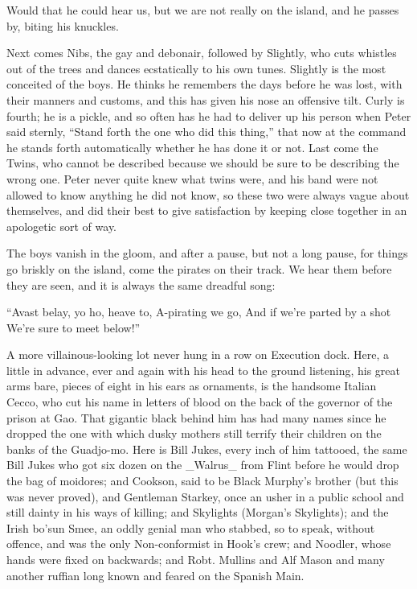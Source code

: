 Would that he could hear us, but we are not really on the island, and
he passes by, biting his knuckles.

Next comes Nibs, the gay and debonair, followed by Slightly, who cuts
whistles out of the trees and dances ecstatically to his own tunes.
Slightly is the most conceited of the boys. He thinks he remembers the
days before he was lost, with their manners and customs, and this has
given his nose an offensive tilt. Curly is fourth; he is a pickle, and
so often has he had to deliver up his person when Peter said sternly,
``Stand forth the one who did this thing,'' that now at the command he
stands forth automatically whether he has done it or not. Last come the
Twins, who cannot be described because we should be sure to be
describing the wrong one. Peter never quite knew what twins were, and
his band were not allowed to know anything he did not know, so these
two were always vague about themselves, and did their best to give
satisfaction by keeping close together in an apologetic sort of way.

The boys vanish in the gloom, and after a pause, but not a long pause,
for things go briskly on the island, come the pirates on their track.
We hear them before they are seen, and it is always the same dreadful
song:

``Avast belay, yo ho, heave to,
    A-pirating we go,
And if we're parted by a shot
    We're sure to meet below!''

A more villainous-looking lot never hung in a row on Execution dock.
Here, a little in advance, ever and again with his head to the ground
listening, his great arms bare, pieces of eight in his ears as
ornaments, is the handsome Italian Cecco, who cut his name in letters
of blood on the back of the governor of the prison at Gao. That
gigantic black behind him has had many names since he dropped the one
with which dusky mothers still terrify their children on the banks of
the Guadjo-mo. Here is Bill Jukes, every inch of him tattooed, the same
Bill Jukes who got six dozen on the _Walrus_ from Flint before he would
drop the bag of moidores; and Cookson, said to be Black Murphy's
brother (but this was never proved), and Gentleman Starkey, once an
usher in a public school and still dainty in his ways of killing; and
Skylights (Morgan's Skylights); and the Irish bo'sun Smee, an oddly
genial man who stabbed, so to speak, without offence, and was the only
Non-conformist in Hook's crew; and Noodler, whose hands were fixed on
backwards; and Robt. Mullins and Alf Mason and many another ruffian
long known and feared on the Spanish Main.

